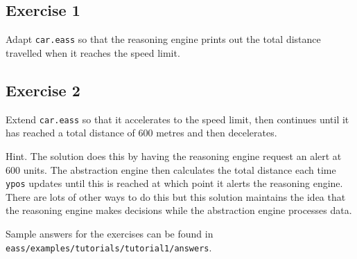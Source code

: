\subsection{Exercise 1}
Adapt \texttt{car.eass} so that the reasoning engine prints out the
total distance travelled when it reaches the speed limit. 

\subsection{Exercise 2}
Extend \texttt{car.eass} so that it accelerates to the speed limit,
then continues until it has reached a total distance of 600 metres and
then decelerates.   

Hint. The solution does this by having the reasoning
engine request an alert at 600
units.  The abstraction engine then calculates the total distance each
time \texttt{ypos} updates until this is reached at which point it
alerts the reasoning engine.  There are lots of other ways to do this
but this solution maintains the idea that the reasoning engine makes
decisions while the abstraction engine
processes data.   

\begin{sloppypar}
Sample answers for the exercises can be found in
\texttt{eass/examples/tutorials/tutorial1/answers}. 
\end{sloppypar}

